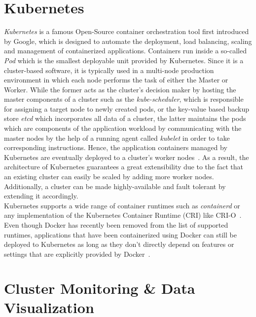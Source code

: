 \section{Kubernetes}
\textit{Kubernetes} is a famous Open-Source container orchestration tool first introduced by Google, which is designed to automate the deployment, load balancing, scaling and management of containerized applications. Containers run inside a so-called \textit{Pod} which is the smallest deployable unit provided by Kubernetes. Since it is a cluster-based software, it is typically used in a multi-node production environment in which each node performs the task of either the Master or Worker. While the former acts as the cluster's decision maker by hosting the master components of a cluster such as the \textit{kube-scheduler}, which is responsible for assigning a target node to newly created pods, or the key-value based backup store \textit{etcd} which incorporates all data of a cluster, the latter maintains the pods which are components of the application workload by communicating with the master nodes by the help of a running agent called \textit{kubelet} in order to take corresponding instructions. Hence, the application containers managed by Kubernetes are eventually deployed to a cluster's worker nodes~\parencite{k8s-components}. As a result, the architecture of Kubernetes guarantees a great extensibility due to the fact that an existing cluster can easily be scaled by adding more worker nodes. Additionally, a cluster can be made highly-available and fault tolerant by extending it accordingly.\\
Kubernetes supports a wide range of container runtimes such as \textit{containerd} or any implementation of the Kubernetes Container Runtime (CRI) like CRI-O~\parencite{k8s-components}. Even though Docker has recently been removed from the list of supported runtimes, applications that have been containerized using Docker can still be deployed to Kubernetes as long as they don't directly depend on features or settings that are explicitly provided by Docker~\parencite{k8s-docker-drop}.

\section{Cluster Monitoring \& Data Visualization}
